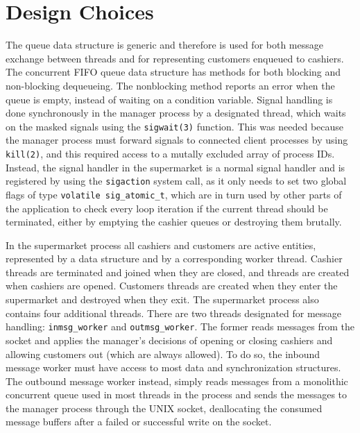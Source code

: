 \documentclass{article}
\begin{document}
    \section{Design Choices}
    The queue data structure is generic and therefore is used for both message
    exchange between threads and for representing customers enqueued to cashiers.
    The concurrent FIFO queue data structure has methods for both blocking
    and non-blocking dequeueing. The nonblocking method reports
    an error when the queue is empty, instead of waiting on a condition variable.
    Signal handling is done synchronously in the manager process by a designated
    thread, which waits on the masked signals using the \texttt{sigwait(3)}
    function. This was needed because the manager process must forward
    signals to connected client processes by using \texttt{kill(2)}, and
    this required access to a mutally excluded array of process IDs. Instead, the signal
    handler in the supermarket is a normal signal handler and is registered
    by using the \texttt{sigaction} system call, as it only needs to set
    two global flags of type \texttt{volatile sig\_atomic\_t}, which are in turn
    used by other parts of the application to check every loop iteration if
    the current thread should be terminated, either by emptying the cashier queues
    or destroying them brutally. 


    In the supermarket process all cashiers and customers are active entities, represented
    by a data structure and by a corresponding worker thread. Cashier threads are terminated
    and joined when they are closed, and threads are created when cashiers are opened.
    Customers threads are created when they enter the supermarket and destroyed when they
    exit. The supermarket process also contains four additional threads. There are
    two threads designated for message handling:
    \texttt{inmsg\_worker} and \texttt{outmsg\_worker}. The former reads messages
    from the socket and applies the manager's decisions of opening or closing cashiers
    and allowing customers out (which are always allowed). To do so, the inbound message
    worker must have access to most data and synchronization structures.
    The outbound message worker
    instead, simply reads messages from a monolithic concurrent queue used in most threads in the process
    and sends the messages to the manager process through the UNIX socket,
    deallocating the consumed message buffers after
    a failed or successful write on the socket.
\end{document}
